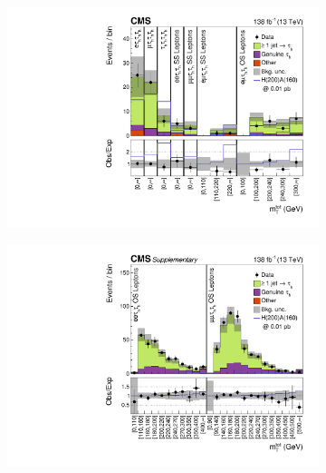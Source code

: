 \begin{figure}[!htbp]
        \centering
        \begin{subfigure}[b]{0.49\textwidth}
            \centering
            \includegraphics[width=\textwidth]{Figures/Chapter6/postfit_plots_combined_postfit_low_stat_paper.pdf}
            \caption{}
        \end{subfigure}
        \begin{subfigure}[b]{0.49\textwidth}
            \centering
            \includegraphics[width=\textwidth]{Figures/Chapter6/postfit_plots_combined_postfit_med_stat_paper.pdf}
            \caption{}
        \end{subfigure}
        \vspace{0.5cm}
        \begin{subfigure}[b]{0.49\textwidth}

\end{subfigure}
\end{figure}
